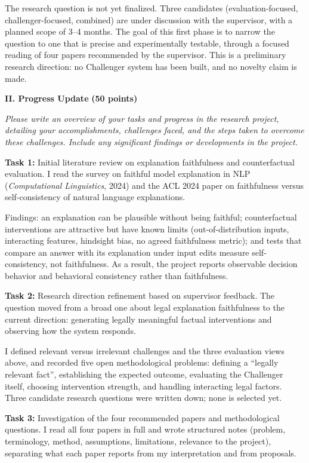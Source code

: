 \documentclass[11pt,a4paper]{article}
\newcommand{\sect}[2]{\textbf{#1} \textbf{(#2 points)}\par}
\newcommand{\hint}[1]{{\small\itshape #1}\par}
\begin{document}
The research question is not yet finalized. Three candidates (evaluation-focused, challenger-focused, combined) are under discussion with the supervisor, with a planned scope of 3--4 months. The goal of this first phase is to narrow the question to one that is precise and experimentally testable, through a focused reading of four papers recommended by the supervisor. This is a preliminary research direction: no Challenger system has been built, and no novelty claim is made.

\bigskip
\sect{II. Progress Update}{50}
\hint{Please write an overview of your tasks and progress in the research project, detailing your accomplishments, challenges faced, and the steps taken to overcome these challenges. Include any significant findings or developments in the project.}

\textbf{Task 1: } Initial literature review on explanation faithfulness and counterfactual evaluation. I read the survey on faithful model explanation in NLP (\textit{Computational Linguistics}, 2024) and the ACL 2024 paper on faithfulness versus self-consistency of natural language explanations.

Findings: an explanation can be plausible without being faithful; counterfactual interventions are attractive but have known limits (out-of-distribution inputs, interacting features, hindsight bias, no agreed faithfulness metric); and tests that compare an answer with its explanation under input edits measure self-consistency, not faithfulness. As a result, the project reports observable decision behavior and behavioral consistency rather than faithfulness.

\textbf{Task 2: } Research direction refinement based on supervisor feedback. The question moved from a broad one about legal explanation faithfulness to the current direction: generating legally meaningful factual interventions and observing how the system responds.

I defined relevant versus irrelevant challenges and the three evaluation views above, and recorded five open methodological problems: defining a ``legally relevant fact'', establishing the expected outcome, evaluating the Challenger itself, choosing intervention strength, and handling interacting legal factors. Three candidate research questions were written down; none is selected yet.

\textbf{Task 3: } Investigation of the four recommended papers and methodological questions. I read all four papers in full and wrote structured notes (problem, terminology, method, assumptions, limitations, relevance to the project), separating what each paper reports from my interpretation and from proposals.
\end{document}
